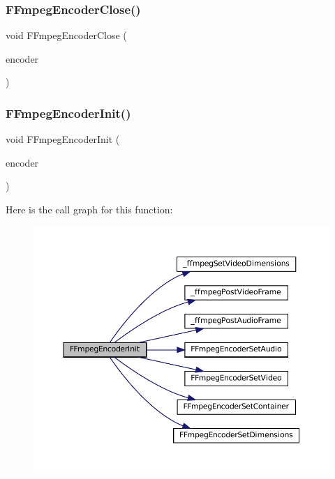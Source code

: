 \subsubsection{\texorpdfstring{F\+Fmpeg\+Encoder\+Close()}{FFmpegEncoderClose()}}
{\footnotesize\ttfamily void F\+Fmpeg\+Encoder\+Close (\begin{DoxyParamCaption}\item[{struct \mbox{\hyperlink{ffmpeg-encoder_8h_struct_f_fmpeg_encoder}{F\+Fmpeg\+Encoder}} $\ast$}]{encoder }\end{DoxyParamCaption})}

\mbox{\label{ffmpeg-encoder_8c_ac78d06a668741ed714dfe5e4a69a2079}} 
\subsubsection{\texorpdfstring{F\+Fmpeg\+Encoder\+Init()}{FFmpegEncoderInit()}}
{\footnotesize\ttfamily void F\+Fmpeg\+Encoder\+Init (\begin{DoxyParamCaption}\item[{struct \mbox{\hyperlink{ffmpeg-encoder_8h_struct_f_fmpeg_encoder}{F\+Fmpeg\+Encoder}} $\ast$}]{encoder }\end{DoxyParamCaption})}

Here is the call graph for this function\+:
\nopagebreak
\begin{figure}[H]
\begin{center}
\leavevmode
\includegraphics[width=350pt]{ffmpeg-encoder_8c_ac78d06a668741ed714dfe5e4a69a2079_cgraph}
\end{center}
\end{figure}
\mbox{\label{ffmpeg-encoder_8c_a3b83672eac569095bfa3a613f8301914}} 
